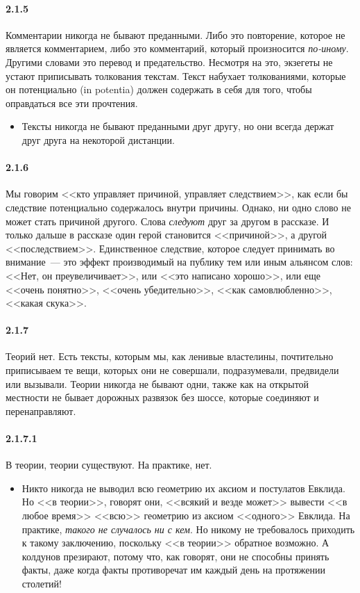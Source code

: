\paragraph{2.1.5}\hypertarget{par:2.1.5}{} Комментарии никогда не бывают преданными. Либо это повторение, которое не является комментарием, либо это комментарий, который произносится {\itshape по-иному}. Другими словами это перевод и предательство. Несмотря на это, экзегеты не устают приписывать толкования текстам. Текст набухает толкованиями, которые он потенциально (in potentia) должен содержать в себя для того, чтобы оправдаться все эти прочтения. 
	\begin{itemize}
	\item 
	Тексты никогда не бывают преданными друг другу, но они всегда держат друг друга на некоторой дистанции.
	\end{itemize}

\paragraph{2.1.6}\hypertarget{par:2.1.6}{} Мы говорим <<кто управляет причиной, управляет следствием>>, как если бы следствие потенциально содержалось внутри причины. Однако, ни одно слово не может стать причиной другого. Слова {\itshape следуют} друг за другом в рассказе. И только дальше в рассказе один герой становится <<причиной>>, а другой <<последствием>>. Единственное следствие, которое следует принимать во внимание~--- это эффект производимый на публику тем или иным альянсом слов: <<Нет, он преувеличивает>>, или <<это написано хорошо>>, или еще <<очень понятно>>, <<очень убедительно>>, <<как самовлюбленно>>, <<какая скука>>.

\paragraph{2.1.7}\hypertarget{par:2.1.7}{} Теорий нет. Есть тексты, которым мы, как ленивые властелины, почтительно приписываем те вещи, которых они не совершали, подразумевали, предвидели или вызывали. Теории никогда не бывают одни, также как на открытой местности не бывает дорожных развязок без шоссе, которые соединяют и перенаправляют.

\paragraph{2.1.7.1}\hypertarget{par:2.1.7.1}{} В теории, теории существуют. На практике, нет. 
	\begin{itemize}
	\item 
	Никто никогда не выводил всю геометрию их аксиом и постулатов Евклида. Но <<в теории>>, говорят они, <<всякий и везде может>> вывести <<в любое время>> <<всю>> геометрию из аксиом <<одного>> Евклида. На практике, {\itshape такого не случалось ни с кем}. Но никому не требовалось приходить к такому заключению, поскольку <<в теории>> обратное возможно. А колдунов презирают, потому что, как говорят, они не способны принять факты, даже когда факты противоречат им каждый день на протяжении столетий!
	\end{itemize}


